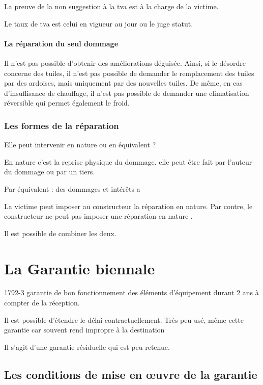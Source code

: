 				La preuve de la non suggestion à la tva est à la charge de la victime.

				Le taux de tva est celui en vigueur au jour ou le juge statut.

			\paragraph{La réparation du seul dommage} Il n'est pas possible d'obtenir des améliorations déguisée. Ainsi, si le désordre concerne des tuiles, il n'est pas possible de demander le remplacement des tuiles par des ardoises, mais uniquement par des nouvelles tuiles. De même, en cas d'insuffisance de chauffage, il n'est pas possible de demander une climatisation réversible qui permet également le froid.

		\subsubsection{Les formes de la réparation}

			Elle peut intervenir en nature ou en équivalent ?

			En nature c'est la reprise physique du dommage. elle peut être fait par l'auteur du dommage ou par un tiers.

			Par équivalent : des dommages et intérêts a

			La victime peut imposer au constructeur la réparation en nature. Par contre, le constructeur ne peut pas imposer une réparation en nature .

			Il est possible de combiner les deux.

\section{La Garantie biennale}

	1792-3 garantie de bon fonctionnement des éléments d’équipement durant 2 ans à compter de la réception.

	Il est possible d’étendre le délai contractuellement. Très peu usé, même cette garantie car souvent rend impropre à la destination

	Il s'agit d'une garantie résiduelle qui est peu retenue.

	\subsection{Les conditions de mise en œuvre de la garantie}


